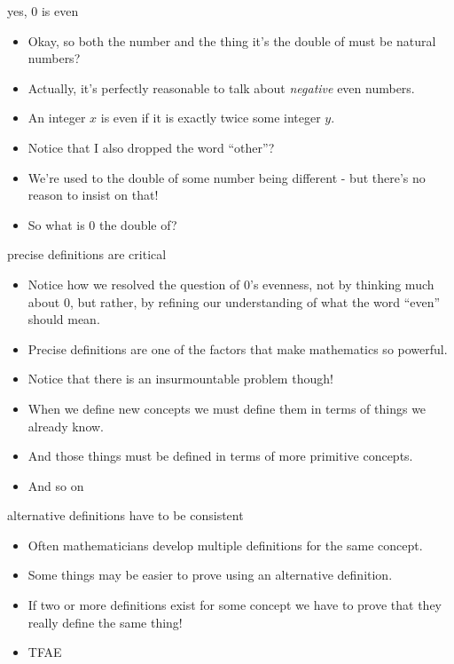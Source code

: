 \documentclass[landscape]{beamer}
\begin{document}
\begin{frame}{yes, 0 is even}
\begin{itemize}
\item Okay, so both the number and the thing it's the double of must be natural numbers? \pause
\item Actually, it's perfectly reasonable to talk about {\em negative} even numbers. \pause
\item An integer $x$ is even if it is exactly twice some integer $y$. \pause
\item Notice that I also dropped the word ``other''?\pause
\item We're used to the double of some number being different - but there's no reason to insist on that! \pause
\item So what is $0$ the double of?
  
\end{itemize}
\end{frame}

\begin{frame}{precise definitions are critical}
\begin{itemize}
\item Notice how we resolved the question of $0$'s evenness, not by thinking much about $0$, but rather, by refining our understanding of what the word ``even'' should mean. \pause
\item Precise definitions are one of the factors that make mathematics so powerful. \pause
\item Notice that there is an insurmountable problem though! \pause 
\item When we define new concepts we must define them in terms of things we already know. \pause
\item And those things must be defined in terms of more primitive concepts. \pause
\item And so on \textellipsis \pause
\end{itemize}
\end{frame}

\begin{frame}{alternative definitions have to be consistent}
\begin{itemize}
\item Often mathematicians develop multiple definitions for the same concept. \pause
\item Some things may be easier to prove using an alternative definition. \pause
\item If two or more definitions exist for some concept we have to prove that they really define the same thing! \pause
\item TFAE
\end{itemize}
\end{frame}
\end{document}

